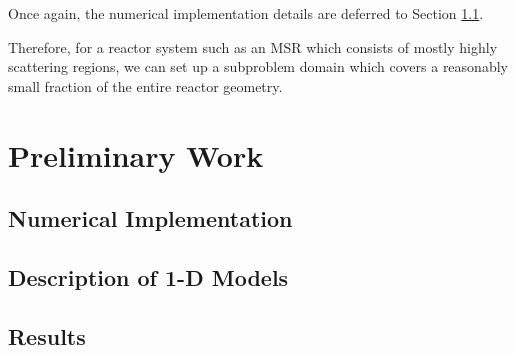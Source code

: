 Once again, the numerical implementation details are deferred to Section \ref{sec:implementation}.

Therefore, for a reactor system such as an \gls{MSR} which consists of mostly highly scattering
regions, we can set up a subproblem domain which covers a reasonably small fraction of the entire
reactor geometry. 

\section{Preliminary Work} \label{sec:preliminary}

\subsection{Numerical Implementation} \label{sec:implementation}

\subsection{Description of 1-D Models}

\subsection{Results}
